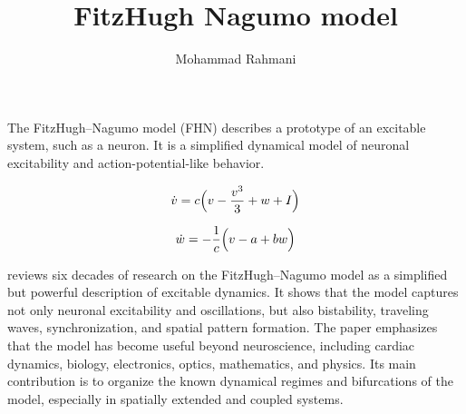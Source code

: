 \documentclass[a4paper]{article}
\title{FitzHugh Nagumo model}
\date{}
\author{Mohammad Rahmani}
\begin{document}
    \maketitle
    The FitzHugh--Nagumo model (FHN)\cite{cebrian-lacasa-2025-six-decades-of-the-fitzhugh-nagumo-model-a-guide-through-its-spatio-temporal-dynamics-and-influence-across-disciplines} describes a prototype of an excitable system, such as a neuron.
    It is a simplified dynamical model of neuronal excitability and action-potential-like behavior.
    
    \begin{equation}
        \dot{v}
        =
        c
        \Bigl(
        v
        -
        \frac{v^{3}}{3}
        +
        w
        +
        I
        \Bigr)
    \end{equation}
    
    \begin{equation}
        \dot{w}
        =
        -
        \frac{1}{c}
        \Bigl(
        v
        -
        a
        +
        bw
        \Bigr)
    \end{equation}
    
    \cite{cebrian-lacasa-2025-six-decades-of-the-fitzhugh-nagumo-model-a-guide-through-its-spatio-temporal-dynamics-and-influence-across-disciplines}
    reviews six decades of research on the FitzHugh--Nagumo model as a simplified but powerful description of excitable dynamics.
    It shows that the model captures not only neuronal excitability and oscillations, but also bistability, traveling waves, synchronization, and spatial pattern formation.
    The paper emphasizes that the model has become useful beyond neuroscience, including cardiac dynamics, biology, electronics, optics, mathematics, and physics.
    Its main contribution is to organize the known dynamical regimes and bifurcations of the model, especially in spatially extended and coupled systems.
    
    
\end{document}
